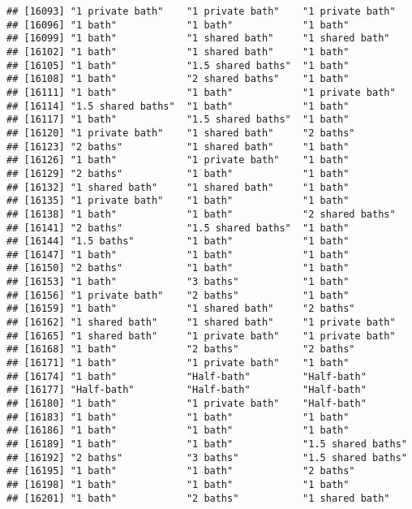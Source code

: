 \documentclass[
]{article}
\begin{document}
\begin{verbatim}
## [16093] "1 private bath"    "1 private bath"    "1 private bath"   
## [16096] "1 bath"            "1 bath"            "1 bath"           
## [16099] "1 bath"            "1 shared bath"     "1 shared bath"    
## [16102] "1 bath"            "1 shared bath"     "1 bath"           
## [16105] "1 bath"            "1.5 shared baths"  "1 bath"           
## [16108] "1 bath"            "2 shared baths"    "1 bath"           
## [16111] "1 bath"            "1 bath"            "1 private bath"   
## [16114] "1.5 shared baths"  "1 bath"            "1 bath"           
## [16117] "1 bath"            "1.5 shared baths"  "1 bath"           
## [16120] "1 private bath"    "1 shared bath"     "2 baths"          
## [16123] "2 baths"           "1 shared bath"     "1 bath"           
## [16126] "1 bath"            "1 private bath"    "1 bath"           
## [16129] "2 baths"           "1 bath"            "1 bath"           
## [16132] "1 shared bath"     "1 shared bath"     "1 bath"           
## [16135] "1 private bath"    "1 bath"            "1 bath"           
## [16138] "1 bath"            "1 bath"            "2 shared baths"   
## [16141] "2 baths"           "1.5 shared baths"  "1 bath"           
## [16144] "1.5 baths"         "1 bath"            "1 bath"           
## [16147] "1 bath"            "1 bath"            "1 bath"           
## [16150] "2 baths"           "1 bath"            "1 bath"           
## [16153] "1 bath"            "3 baths"           "1 bath"           
## [16156] "1 private bath"    "2 baths"           "1 bath"           
## [16159] "1 bath"            "1 shared bath"     "2 baths"          
## [16162] "1 shared bath"     "1 shared bath"     "1 private bath"   
## [16165] "1 shared bath"     "1 private bath"    "1 private bath"   
## [16168] "1 bath"            "2 baths"           "2 baths"          
## [16171] "1 bath"            "1 private bath"    "1 bath"           
## [16174] "1 bath"            "Half-bath"         "Half-bath"        
## [16177] "Half-bath"         "Half-bath"         "Half-bath"        
## [16180] "1 bath"            "1 private bath"    "Half-bath"        
## [16183] "1 bath"            "1 bath"            "1 bath"           
## [16186] "1 bath"            "1 bath"            "1 bath"           
## [16189] "1 bath"            "1 bath"            "1.5 shared baths" 
## [16192] "2 baths"           "3 baths"           "1.5 shared baths" 
## [16195] "1 bath"            "1 bath"            "2 baths"          
## [16198] "1 bath"            "1 bath"            "1 bath"           
## [16201] "1 bath"            "2 baths"           "1 shared bath"    

\end{verbatim}
\end{document}

